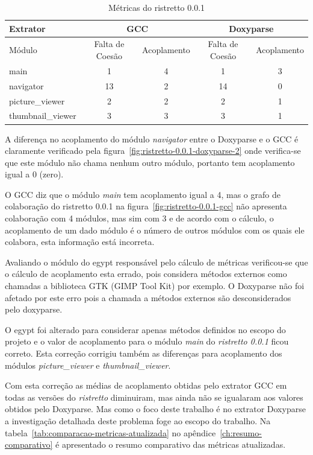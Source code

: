 \begin{table}
\caption{Métricas do ristretto 0.0.1}
\centering
\begin{tabular}{| l | c c | c c |}
\hline
Extrator          & \multicolumn{2}{|c|}{GCC}        & \multicolumn{2}{|c|}{Doxyparse} \\
\hline
Módulo            & Falta de Coesão & Acoplamento    & Falta de Coesão & Acoplamento   \\
\hline
main              & 1               & 4              & 1               & 3             \\
navigator         & 13              & 2              & 14              & 0             \\
picture\_viewer   & 2               & 2              & 2               & 1             \\
thumbnail\_viewer & 3               & 3              & 3               & 1             \\
\hline
\end{tabular}
\label{tab:comparacao-metricas-ristretto-0.0.1}
\end{table}

A diferença no acoplamento do módulo {\it navigator} entre o Doxyparse e o GCC
é claramente verificado pela figura~\ref{fig:ristretto-0.0.1-doxyparse-2} onde
verifica-se que este módulo não chama nenhum outro módulo, portanto tem
acoplamento igual a 0 (zero).

O GCC diz que o módulo {\it main} tem acoplamento igual a 4, mas o grafo de
colaboração do ristretto 0.0.1 na figura~\ref{fig:ristretto-0.0.1-gcc} não
apresenta colaboração com 4 módulos, mas sim com 3 e de acordo com o cálculo, o
acoplamento de um dado módulo é o número de outros módulos com os quais ele
colabora, esta informação está incorreta.

Avaliando o módulo do egypt responsável pelo cálculo de métricas verificou-se
que o cálculo de acoplamento esta errado, pois considera métodos externos
como chamadas a biblioteca GTK (GIMP Tool Kit) por exemplo. O Doxyparse não foi afetado por este erro pois a chamada a
métodos externos são desconsiderados pelo doxyparse.

O egypt foi alterado para considerar apenas métodos definidos no escopo do
projeto e o valor de acoplamento para o módulo {\it main} do {\it ristretto
0.0.1} ficou correto. Esta correção corrigiu também as diferenças para
acoplamento dos módulos {\it picture\_viewer} e {\it thumbnail\_viewer}.

Com esta correção as médias de acoplamento obtidas pelo extrator GCC em todas
as versões do {\it ristretto} diminuiram, mas ainda não se igualaram aos
valores obtidos pelo Doxyparse. Mas como o foco deste trabalho é no extrator
Doxyparse a investigação detalhada deste problema foge ao escopo do trabalho.
Na tabela~\ref{tab:comparacao-metricas-atualizada} no
apêndice~\ref{ch:resumo-comparativo} é apresentado o resumo comparativo das
métricas atualizadas.

